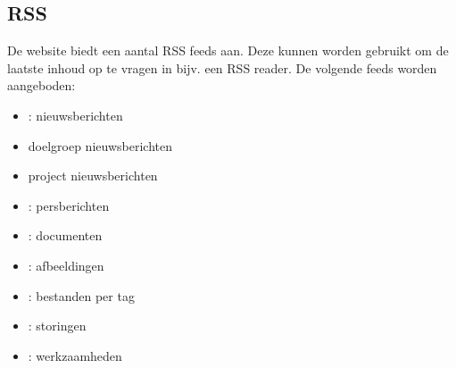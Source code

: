 \subsection{RSS}
De website biedt een aantal RSS feeds aan. Deze kunnen worden gebruikt om de laatste inhoud op te vragen in bijv. een RSS reader. De volgende feeds worden aangeboden:
\begin{itemize}
\item {}: nieuwsberichten
\item {} doelgroep nieuwsberichten
\item {} project nieuwsberichten
\item {}: persberichten
\item {}: documenten
\item {}: afbeeldingen
\item {}: bestanden per tag
\item {}: storingen
\item {}: werkzaamheden
\end{itemize}
